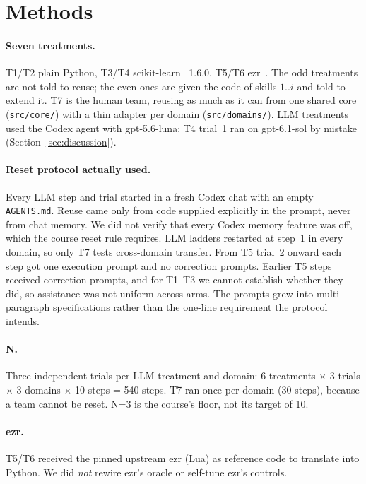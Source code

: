 \documentclass[acmsmall,nonacm]{acmart}
\begin{document}
\section{Methods}

\paragraph{Seven treatments.} T1/T2 plain Python, T3/T4 scikit-learn~\cite{sklearn} 1.6.0, T5/T6 ezr~\cite{ezr}. The odd treatments are not told to reuse; the even ones are given the code of skills $1..i$ and told to extend it. T7 is the human team, reusing as much as it can from one shared core (\texttt{src/core/}) with a thin adapter per domain (\texttt{src/domains/}). LLM treatments used the Codex agent with gpt-5.6-luna; T4 trial~1 ran on gpt-6.1-sol by mistake (Section~\ref{sec:discussion}).

\paragraph{Reset protocol actually used.} Every LLM step and trial started in a fresh Codex chat with an empty \texttt{AGENTS.md}. Reuse came only from code supplied explicitly in the prompt, never from chat memory. We did not verify that every Codex memory feature was off, which the course reset rule requires. LLM ladders restarted at step~1 in every domain, so only T7 tests cross-domain transfer. From T5 trial~2 onward each step got one execution prompt and no correction prompts. Earlier T5 steps received correction prompts, and for T1--T3 we cannot establish whether they did, so assistance was not uniform across arms. The prompts grew into multi-paragraph specifications rather than the one-line requirement the protocol intends.

\paragraph{N.} Three independent trials per LLM treatment and domain: 6 treatments $\times$ 3 trials $\times$ 3 domains $\times$ 10 steps = 540 steps. T7 ran once per domain (30 steps), because a team cannot be reset. N=3 is the course's floor, not its target of 10.

\paragraph{ezr.} T5/T6 received the pinned upstream ezr (Lua) as reference code to translate into Python. We did \emph{not} rewire ezr's oracle or self-tune ezr's controls.
\end{document}
